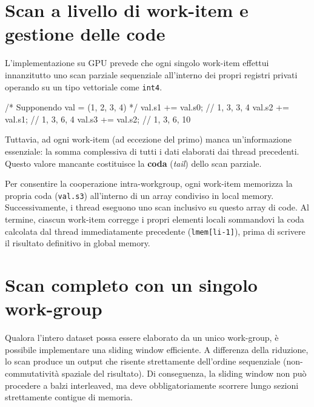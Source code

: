 \section{Scan a livello di work-item e gestione delle code}\label{sec:scan_wi_code}

L'implementazione su GPU prevede che ogni singolo work-item effettui innanzitutto uno scan parziale sequenziale all'interno dei propri registri privati operando su un tipo vettoriale come \texttt{int4}.

\begin{code}[caption={Scansione locale di una quartina}, label={code:scan_quartina}]
/* Supponendo val = (1, 2, 3, 4) */
val.s1 += val.s0; // 1, 3, 3, 4
val.s2 += val.s1; // 1, 3, 6, 4
val.s3 += val.s2; // 1, 3, 6, 10
\end{code}

Tuttavia, ad ogni work-item (ad eccezione del primo) manca un'informazione essenziale: la somma complessiva di tutti i dati elaborati dai thread precedenti. Questo valore mancante costituisce la \textbf{coda} (\emph{tail}) dello scan parziale.

Per consentire la cooperazione intra-workgroup, ogni work-item memorizza la propria coda (\texttt{val.s3}) all'interno di un array condiviso in local memory. Successivamente, i thread eseguono uno scan inclusivo su questo array di code. Al termine, ciascun work-item corregge i propri elementi locali sommandovi la coda calcolata dal thread immediatamente precedente (\texttt{lmem[li-1]}), prima di scrivere il risultato definitivo in global memory.

\section{Scan completo con un singolo work-group}\label{sec:scan_singolo_wg}

Qualora l'intero dataset possa essere elaborato da un unico work-group, è possibile implementare una sliding window efficiente. A differenza della riduzione, lo scan produce un output che risente strettamente dell'ordine sequenziale (non-commutatività spaziale del risultato). Di conseguenza, la sliding window non può procedere a balzi interleaved, ma deve obbligatoriamente scorrere lungo sezioni strettamente contigue di memoria.

